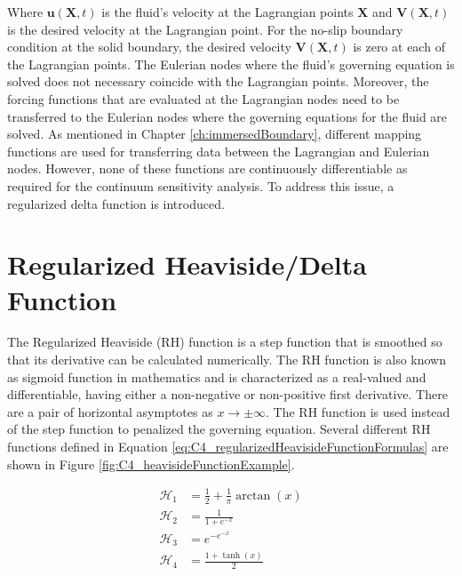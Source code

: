Where $\mathbf{u}(\mathbf{X}, t)$ is the fluid's velocity at the Lagrangian points $\mathbf{X}$ and $\mathbf{V}(\mathbf{X}, t)$ is the desired velocity at the Lagrangian point. For the no-slip boundary condition at the solid boundary, the desired velocity $\mathbf{V}(\mathbf{X}, t)$ is zero at each of the Lagrangian points. The Eulerian nodes where the fluid's governing equation is solved does not necessary coincide with the Lagrangian points. Moreover, the forcing functions that are evaluated at the Lagrangian nodes need to be transferred to the Eulerian nodes where the governing equations for the fluid are solved. As mentioned in Chapter \ref{ch:immersedBoundary}, different mapping functions are used for transferring data between the Lagrangian and Eulerian nodes. However, none of these functions are continuously differentiable as required for the continuum sensitivity analysis. To address this issue, a regularized delta function is introduced.

\section{Regularized Heaviside/Delta Function}\label{sec:C4_RHandRDfunction}
The Regularized Heaviside (RH) function is a step function that is smoothed so that its derivative can be calculated numerically. The RH function is also known as sigmoid function in mathematics and is characterized as a real-valued and differentiable, having either a non-negative or non-positive first derivative. There are a pair of horizontal asymptotes as $x \rightarrow \pm \infty$. The RH function is used instead of the step function to penalized the governing equation.  Several different RH functions defined in Equation \eqref{eq:C4_regularizedHeavisideFunctionFormulas} are shown in Figure \ref{fig:C4_heavisideFunctionExample}.

\begin{subequations}\label{eq:C4_regularizedHeavisideFunctionFormulas}
\begin{align}
    \mathcal{H}_1 &= \frac{1}{2} + \frac{1}{\pi} \arctan \left( x \right) \\
    \mathcal{H}_2 &= \frac{1}{1 + e^{-x}} \\
    \mathcal{H}_3 &= e^{-e^{-x}} \\
    \mathcal{H}_4 &= \frac{1 + \tanh(x)}{2}
\end{align}
\end{subequations}

